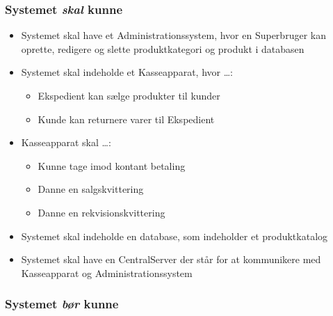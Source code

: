 \subsubsection*{Systemet \textit{skal} kunne}

\begin{itemize}

\item Systemet skal have et Administrationssystem, hvor en Superbruger kan oprette, redigere og slette produktkategori og produkt i databasen
\item Systemet skal indeholde et Kasseapparat, hvor …:
\begin{itemize}
\item Ekspedient kan sælge produkter til kunder
\item Kunde kan returnere varer til Ekspedient
\end{itemize}
\item Kasseapparat skal …:
\begin{itemize}
\item Kunne tage imod kontant betaling
\item Danne en salgskvittering
\item Danne en rekvisionskvittering
\end{itemize}
\item Systemet skal indeholde en database, som indeholder et produktkatalog
\item Systemet skal have en CentralServer der står for at kommunikere med Kasseapparat og Administrationssystem

\end{itemize}


\subsubsection*{Systemet \textit{bør} kunne}

